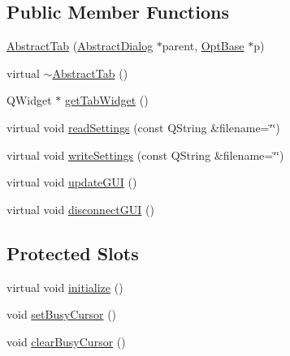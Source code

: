 \subsection*{Public Member Functions}
\begin{DoxyCompactItemize}
\item 
\hyperlink{classGlobalSearch_1_1AbstractTab_aead424f45ea35bc3b8d5d57dc64a9d70}{Abstract\+Tab} (\hyperlink{classGlobalSearch_1_1AbstractDialog}{Abstract\+Dialog} $\ast$parent, \hyperlink{classGlobalSearch_1_1OptBase}{Opt\+Base} $\ast$p)
\item 
virtual \hyperlink{classGlobalSearch_1_1AbstractTab_ab1c9b883cf4fc56d38045028600e20b7}{$\sim$\+Abstract\+Tab} ()
\item 
Q\+Widget $\ast$ \hyperlink{classGlobalSearch_1_1AbstractTab_a2ee691faf240a36dafde7620dc9a9293}{get\+Tab\+Widget} ()
\item 
virtual void \hyperlink{classGlobalSearch_1_1AbstractTab_adc4ad2d0853e7db17a0b147857304cba}{read\+Settings} (const Q\+String \&filename=\char`\"{}\char`\"{})
\item 
virtual void \hyperlink{classGlobalSearch_1_1AbstractTab_a5b09ac7389e664c60ee5ab11a1f8d8fd}{write\+Settings} (const Q\+String \&filename=\char`\"{}\char`\"{})
\item 
virtual void \hyperlink{classGlobalSearch_1_1AbstractTab_a35194ae3ff3b875c1f2e886a69555050}{update\+G\+U\+I} ()
\item 
virtual void \hyperlink{classGlobalSearch_1_1AbstractTab_a63ec89943d1e740fd162877c7cb3679a}{disconnect\+G\+U\+I} ()
\end{DoxyCompactItemize}
\subsection*{Protected Slots}
\begin{DoxyCompactItemize}
\item 
virtual void \hyperlink{classGlobalSearch_1_1AbstractTab_a70d03cb6f128710bd2af11a7915acad4}{initialize} ()
\item 
void \hyperlink{classGlobalSearch_1_1AbstractTab_a4c6f7ae72bcc7e1eaf06734b7ccb8635}{set\+Busy\+Cursor} ()
\item 
void \hyperlink{classGlobalSearch_1_1AbstractTab_a32efcb7e485b106fc728f39d3174df0e}{clear\+Busy\+Cursor} ()
\end{DoxyCompactItemize}
